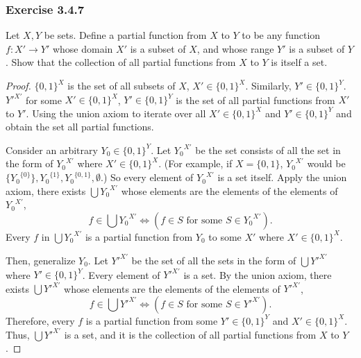 \documentclass[12pt, letter]{article}
\begin{document}
\subsubsection*{Exercise 3.4.7}
Let $X,Y$ be sets. Define a partial function from $X$ to $Y$ to be any function $f:X'\to Y'$ whose domain $X'$ is a subset of $X$, and whose range $Y'$ is a subset of $Y$.
Show that the collection of all partial functions from $X$ to $Y$ is itself a set. 
\begin{proof}
    ${\{0,1\}}^X$ is the set of all subsets of $X$, $X'\in {\{0,1\}}^X$. Similarly, $Y'\in {\{0,1\}}^Y$. $Y'^{X'}$ for some $X'\in {\{0,1\}}^X$, $Y'\in {\{0,1\}}^Y$ is the set of 
    all partial functions from $X'$ to $Y'$. Using the union axiom to iterate over all $X'\in{\{0,1\}}^X$ and $Y'\in{\{0,1\}}^Y$ and obtain the set all partial functions.

    Consider an arbitrary $Y_0 \in {\{0,1\}}^Y$. Let ${Y_0}^{X'}$ be the set consists of all the set in the form of ${Y_0}^{X'}$ where $X'\in {\{0,1\}}^X$. (For example, if $X=\{0,1\}$, ${Y_0}^{X'}$ would be $\{{Y_0}^{\{0\}}\},
    {Y_0}^{\{1\}},{Y_0}^{\{0,1\}},\emptyset$.) So every element of ${Y_0}^{X'}$ is a set itself. Apply the union axiom, there exists $\bigcup {Y_0}^{X'}$ whose elements are the elements of the elements of ${Y_0}^{X'}$, 
    \begin{equation*}
        f\in \bigcup {Y_0}^{X'}\iff (f\in S\text{ for some }S\in {Y_0}^{X'}).
    \end{equation*}
    Every $f$ in $\bigcup {Y_0}^{X'}$ is a partial function from $Y_0$ to some $X'$ where $X'\in {\{0,1\}}^X$.

    Then, generalize $Y_0$. Let ${Y'}^{X'}$ be the set of all the sets in the form of $\bigcup {Y'}^{X'}$ where $Y'\in{\{0,1\}}^{Y}$. Every element of ${Y'}^{X'}$ is a set. By the union axiom,
    there exists $\bigcup {Y'}^{X'}$ whose elements are the elements of the elements of ${Y'}^{X'}$, 
    \begin{equation*}
        f\in \bigcup {Y'}^{X'}\iff (f\in S\text{ for some }S\in {Y'}^{X'}).
    \end{equation*}
    Therefore, every $f$ is a partial function from some $Y'\in {\{0,1\}}^Y$ and $X'\in {\{0,1\}}^X$. Thus, $\bigcup {Y'}^{X'}$ is a set, and it is the collection of all partial functions from $X$ to $Y$.
\end{proof}
\end{document}
